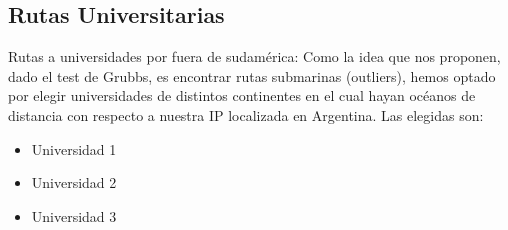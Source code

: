 \subsection{Rutas Universitarias} 

Rutas a universidades por fuera de sudam\'erica: Como la idea que nos proponen, dado el test de Grubbs, es encontrar rutas submarinas (outliers), hemos optado por elegir universidades de distintos continentes en el cual hayan océanos de distancia con respecto a nuestra IP localizada en Argentina. Las elegidas son:

\begin{itemize}
\item Universidad 1
\item Universidad 2
\item Universidad 3
\end{itemize}
